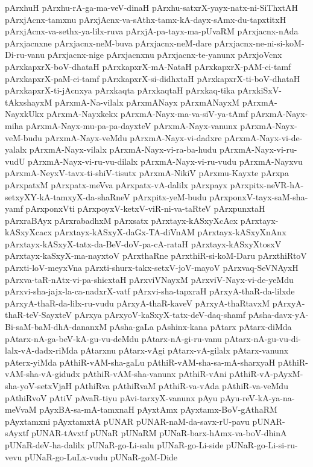 {pArxhuH
pArxhu-rA-ga-ma-veV-dinaH
pArxhu-satxrX-yayx-natx-ni-SiThxtAH
pArxjAcnx-tamxnu
pArxjAcnx-va-sAthx-tamx-kA-dayx-sAmx-du-tapxtitxH
pArxjAcnx-va-sethx-ya-lilx-ruva
pArxjA-pa-tayx-ma-pUvaRM
pArxjacnx-nAda
pArxjacnxne
pArxjacnx-neM-buva
pArxjacnx-neM-dare
pArxjacnx-ne-ni-si-koM-Di-ru-vanu
pArxjacnx-nige
pArxjacnxnu
pArxjacnx-te-yanunx
pArxjoVcnx
pArxkapxrX-boV-dhataH
pArxkapxrX-mA-NataH
pArxkapxrX-pAM-ci-tamf
pArxkapxrX-paM-ci-tamf
pArxkapxrX-si-didhxtaH
pArxkapxrX-ti-boV-dhataH
pArxkapxrX-ti-jAcnxya
pArxkaqta
pArxkaqtaH
pArxkaq-tika
pArxkiSxV-tAkxshayxM
pArxmA-Na-vilalx
pArxmANayx
pArxmANayxM
pArxmA-NayxkUkx
pArxmA-Nayxkekx
pArxmA-Nayx-ma-va-siV-ya-tAmf
pArxmA-Nayx-miha
pArxmA-Nayx-mu-pa-pa-dayxteV
pArxmA-Nayx-vanunx
pArxmA-Nayx-veM-budu
pArxmA-Nayx-veMdu
pArxmA-Nayx-vi-dadxre
pArxmA-Nayx-vi-de-yalalx
pArxmA-Nayx-vilalx
pArxmA-Nayx-vi-ra-ba-hudu
pArxmA-Nayx-vi-ru-vudU
pArxmA-Nayx-vi-ru-vu-dilalx
pArxmA-Nayx-vi-ru-vudu
pArxmA-Nayxvu
pArxmA-NeyxV-tavx-ti-shiV-tisutx
pArxmA-NikiV
pArxmu-Kayxte
pArxpa
pArxpatxM
pArxpatx-meVva
pArxpatx-vA-dalilx
pArxpayx
pArxpitx-neVR-hA-setxyXY-kA-tamxyX-da-shaRneV
pArxpitx-yeM-budu
pArxponxV-tayx-saM-sha-yamf
pArxponxVti
pArxpoyxV-ketxV-viR-ni-va-taRteV
pArxpunxtaH
pArxraBAyx
pArxrabadhxM
pArxsatx
pArxtayx-kASxyXcAcx
pArxtayx-kASxyXcacx
pArxtayx-kASxyX-daGx-TA-diVnAM
pArxtayx-kASxyXnAnx
pArxtayx-kASxyX-tatx-da-BeV-doV-pa-cA-rataH
pArxtayx-kASxyXtosxV
pArxtayx-kaSxyX-ma-nayxtoV
pArxthaRne
pArxthiR-si-koM-Daru
pArxthiRtoV
pArxti-loV-meyxVna
pArxti-shurx-takx-setxV-joV-mayoV
pArxvaq-SeVNAyxH
pArxva-taR-nAtx-vi-pa-shicxtaH
pArxviVNayxM
pArxviV-Nayx-vi-de-yeMdu
pArxvi-sha-jajx-la-ca-nadxrX-vatf
pArxvi-sha-tapxraH
pArxyA-thaR-da-lilxde
pArxyA-thaR-da-lilx-ru-vudu
pArxyA-thaR-kaveV
pArxyA-thaRtavxM
pArxyA-thaR-teV-SayxteV
pArxya
pArxyoV-kaSxyX-tatx-deV-daq-shamf
pAsha-davx-yA-Bi-saM-baM-dhA-dananxM
pAsha-gaLa
pAshinx-kana
pAtarx
pAtarx-diMda
pAtarx-nA-ga-beV-kA-gu-vu-deMdu
pAtarx-nA-gi-ru-vanu
pAtarx-nA-gu-vu-di-lalx-vA-dadx-riMda
pAtarxnu
pAtarx-vAgi
pAtarx-vA-gilalx
pAtarx-vanunx
pAterx-yiMda
pAthiR-vAM-sha-gaLu
pAthiR-vAM-sha-sa-mA-sharxyaH
pAthiR-vAM-sha-vA-gidudx
pAthiR-vAM-sha-vanunx
pAthiR-vAni
pAthiR-vA-pAyxM-sha-yoV-setxVjaH
pAthiRva
pAthiRvaM
pAthiR-va-vAda
pAthiR-va-veMdu
pAthiRvoV
pAtiV
pAvaR-tiyu
pAvi-tarxyX-vanunx
pAyu
pAyu-reV-kA-ya-na-meVvaM
pAyxBA-sa-mA-tamxnaH
pAyxtAmx
pAyxtamx-BoV-gAthaRM
pAyxtamxni
pAyxtamxtA
pUNAR
pUNAR-naM-da-savx-rU-pavu
pUNAR-sAyxtf
pUNAR-tAvxtf
pUNaR
pUNaRM
pUNaR-barx-hAmx-va-boV-dhinA
pUNaR-deV-ha-dalilx
pUNaR-go-Li-salu
pUNaR-go-Li-side
pUNaR-go-Li-si-ru-vevu
pUNaR-go-LuLx-vudu
pUNaR-goM-Dide
}
